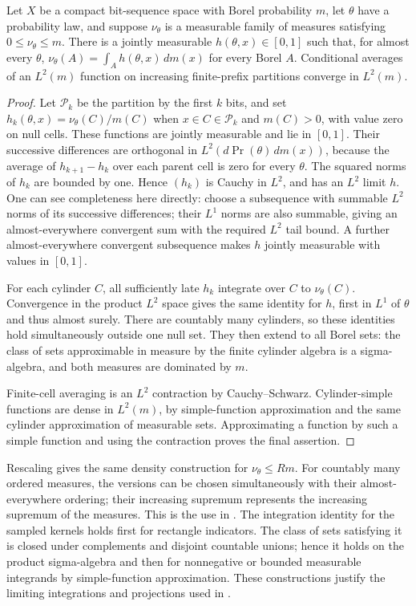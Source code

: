 \begin{lemma}
\label{lem:cylinder-densities}
Let $X$ be a compact bit-sequence space with Borel probability $m$,
let $\theta$ have a probability law, and suppose $\nu_\theta$ is a
measurable family of measures satisfying $0\le\nu_\theta\le m$.
There is a jointly measurable $h(\theta,x)\in[0,1]$ such that,
for almost every $\theta$, $\nu_\theta(A)=\int_Ah(\theta,x)\,dm(x)$
for every Borel $A$. Conditional averages of an $L^2(m)$ function
on increasing finite-prefix partitions converge in $L^2(m)$.
\end{lemma}
\begin{proof}
Let $\mathcal P_k$ be the partition by the first $k$ bits, and set
$h_k(\theta,x)=\nu_\theta(C)/m(C)$ when $x\in C\in\mathcal P_k$
and $m(C)>0$, with value zero on null cells. These functions are
jointly measurable and lie in $[0,1]$. Their successive differences
are orthogonal in $L^2(d\Pr(\theta)\,dm(x))$, because the average of
$h_{k+1}-h_k$ over each parent cell is zero for every $\theta$.
The squared norms of $h_k$ are bounded by one. Hence $(h_k)$ is
Cauchy in $L^2$, and has an $L^2$ limit $h$. One can see completeness
here directly: choose a subsequence with summable $L^2$ norms of its
successive differences; their $L^1$ norms are also summable, giving
an almost-everywhere convergent sum with the required $L^2$ tail bound.
A further almost-everywhere convergent subsequence makes $h$ jointly
measurable with values in $[0,1]$.

For each cylinder $C$, all sufficiently late $h_k$ integrate over $C$
to $\nu_\theta(C)$. Convergence in the product $L^2$ space gives
the same identity for $h$, first in $L^1$ of $\theta$ and thus almost
surely. There are countably many cylinders, so these identities hold
simultaneously outside one null set. They then extend to all Borel
sets: the class of sets approximable in measure by the finite cylinder
algebra is a sigma-algebra, and both measures are dominated by $m$.

Finite-cell averaging is an $L^2$ contraction by Cauchy--Schwarz.
Cylinder-simple functions are dense in $L^2(m)$, by simple-function
approximation and the same cylinder approximation of measurable sets.
Approximating a function by such a simple function and using the
contraction proves the final assertion.
\end{proof}

Rescaling gives the same density construction for $\nu_\theta\le Rm$.
For countably many ordered measures, the versions can be chosen
simultaneously with their almost-everywhere ordering; their increasing
supremum represents the increasing supremum of the measures. This is
the use in . The integration identity for
the sampled kernels holds first for rectangle indicators. The class of
sets satisfying it is closed under complements and disjoint countable
unions; hence it holds on the product sigma-algebra and then for
nonnegative or bounded measurable integrands by simple-function
approximation. These constructions justify the limiting integrations
and projections used in .

